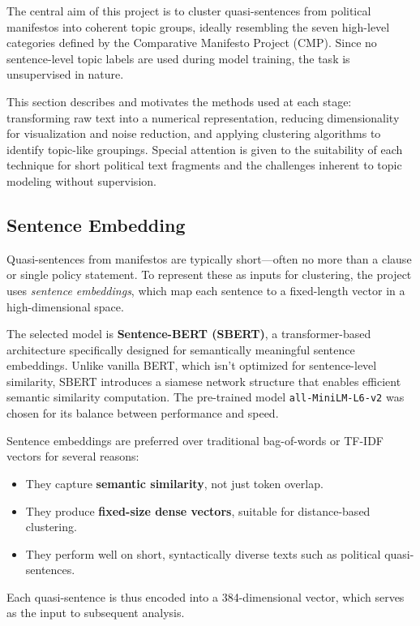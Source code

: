 \documentclass[
  letterpaper,
  DIV=11,
  numbers=noendperiod]{scrartcl}
\providecommand{\tightlist}{%
  \setlength{\itemsep}{0pt}\setlength{\parskip}{0pt}}
\begin{document}
The central aim of this project is to cluster quasi-sentences from
political manifestos into coherent topic groups, ideally resembling the
seven high-level categories defined by the Comparative Manifesto Project
(CMP). Since no sentence-level topic labels are used during model
training, the task is unsupervised in nature.

This section describes and motivates the methods used at each stage:
transforming raw text into a numerical representation, reducing
dimensionality for visualization and noise reduction, and applying
clustering algorithms to identify topic-like groupings. Special
attention is given to the suitability of each technique for short
political text fragments and the challenges inherent to topic modeling
without supervision.

\subsection{Sentence Embedding}\label{sentence-embedding}

Quasi-sentences from manifestos are typically short---often no more than
a clause or single policy statement. To represent these as inputs for
clustering, the project uses \emph{sentence embeddings}, which map each
sentence to a fixed-length vector in a high-dimensional space.

The selected model is \textbf{Sentence-BERT (SBERT)}, a
transformer-based architecture specifically designed for semantically
meaningful sentence embeddings. Unlike vanilla BERT, which isn't
optimized for sentence-level similarity, SBERT introduces a siamese
network structure that enables efficient semantic similarity
computation. The pre-trained model \texttt{all-MiniLM-L6-v2} was chosen
for its balance between performance and speed.

Sentence embeddings are preferred over traditional bag-of-words or
TF-IDF vectors for several reasons:

\begin{itemize}
\tightlist
\item
  They capture \textbf{semantic similarity}, not just token overlap.
\item
  They produce \textbf{fixed-size dense vectors}, suitable for
  distance-based clustering.
\item
  They perform well on short, syntactically diverse texts such as
  political quasi-sentences.
\end{itemize}

Each quasi-sentence is thus encoded into a 384-dimensional vector, which
serves as the input to subsequent analysis.
\end{document}
